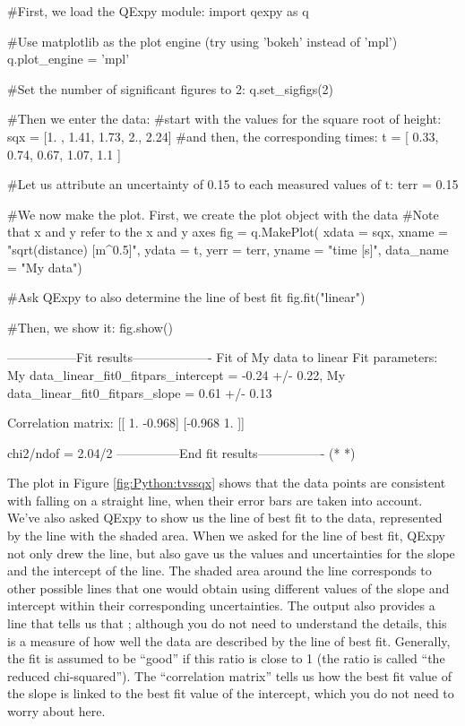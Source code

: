 \begin{python}[caption=Using QExPy to plot and fit linear data]
#First, we load the QExpy module:
import qexpy as q

#Use matplotlib as the plot engine (try using 'bokeh' instead of 'mpl')
q.plot_engine = 'mpl'

#Set the number of significant figures to 2:
q.set_sigfigs(2)

#Then we enter the data:
#start with the values for the square root of height:
sqx = [1. , 1.41, 1.73, 2., 2.24]
#and then, the corresponding times:
t = [ 0.33,  0.74,  0.67,  1.07,  1.1 ]

#Let us attribute an uncertainty of 0.15 to each measured values of t:
terr = 0.15

#We now make the plot. First, we create the plot object with the data
#Note that x and y refer to the x and y axes
fig = q.MakePlot( xdata = sqx, xname = "sqrt(distance) [m^0.5]",
                  ydata = t, yerr = terr, yname = "time [s]",
                  data_name = "My data")
                  
#Ask QExpy to also determine the line of best fit                  
fig.fit("linear")
                  
#Then, we show it:
fig.show()           
\end{python}
\begin{poutput}
-----------------Fit results-------------------
Fit of  My data  to  linear
Fit parameters:
My data_linear_fit0_fitpars_intercept = -0.24 +/- 0.22,
My data_linear_fit0_fitpars_slope = 0.61 +/- 0.13

Correlation matrix: 
[[ 1.    -0.968]
 [-0.968  1.   ]]

chi2/ndof = 2.04/2
---------------End fit results----------------
(*  *)
\end{poutput}
The plot in Figure \ref{fig:Python:tvssqx} shows that the data points are consistent with falling on a straight line, when their error bars are taken into account. We've also asked QExpy to show us the line of best fit to the data, represented by the line with the shaded area. When we asked for the line of best fit, QExpy not only drew the line, but also gave us the values and uncertainties for the slope and the intercept of the line. The shaded area around the line corresponds to other possible lines that one would obtain using different values of the slope and intercept within their corresponding uncertainties. The output also provides a line that tells us that ; although you do not need to understand the details, this is a measure of how well the data are described by the line of best fit. Generally, the fit is assumed to be ``good'' if this ratio is close to 1 (the ratio is called ``the reduced chi-squared'').  The ``correlation matrix'' tells us how the best fit value of the slope is linked to the best fit value of the intercept, which you do not need to worry about here.


